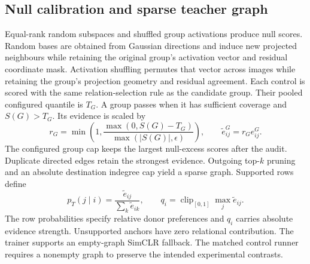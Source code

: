 \documentclass{article}
\begin{document}
\subsection{Null calibration and sparse teacher graph}
Equal-rank random subspaces and shuffled group activations produce null scores.
Random bases are obtained from Gaussian directions and induce new projected
neighbours while retaining the original group's activation vector and residual
coordinate mask. Activation shuffling permutes that vector across images while
retaining the group's projection geometry and residual agreement. Each control
is scored with the same relation-selection rule as the candidate group.
Their pooled configured quantile is $T_G$. A group passes when it has sufficient
coverage and $S(G)>T_G$. Its evidence is scaled by
\begin{equation}
 r_G=\min\!\left(1,\frac{\max(0,S(G)-T_G)}{\max(|S(G)|,\epsilon)}\right),
 \qquad \tilde e_{ij}^{G}=r_Ge_{ij}^{G}.
\end{equation}
The configured group cap keeps the largest null-excess scores after the audit.
Duplicate directed edges retain
the strongest evidence. Outgoing top-$k$ pruning and an absolute destination
indegree cap yield a sparse graph. Supported rows define
\begin{equation}
 p_T(j\mid i)=\frac{\tilde e_{ij}}{\sum_k\tilde e_{ik}},\qquad
 q_i=\operatorname{clip}_{[0,1]}\max_j\tilde e_{ij}.
\end{equation}
The row probabilities specify relative donor preferences and $q_i$ carries
absolute evidence strength. Unsupported anchors have zero relational contribution.
The trainer supports an empty-graph SimCLR fallback. The matched control runner
requires a nonempty graph to preserve the intended experimental contrasts.
\end{document}
